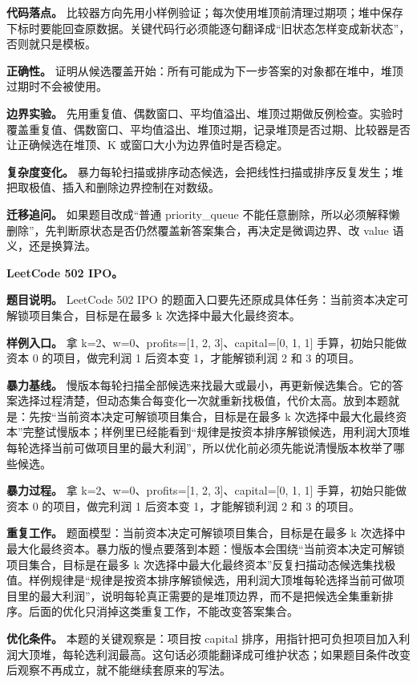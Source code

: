 \textbf{代码落点。} 比较器方向先用小样例验证；每次使用堆顶前清理过期项；堆中保存下标时要能回查原数据。关键代码行必须能逐句翻译成“旧状态怎样变成新状态”，否则就只是模板。

\textbf{正确性。} 证明从候选覆盖开始：所有可能成为下一步答案的对象都在堆中，堆顶过期时不会被使用。

\textbf{边界实验。} 先用重复值、偶数窗口、平均值溢出、堆顶过期做反例检查。实验时覆盖重复值、偶数窗口、平均值溢出、堆顶过期，记录堆顶是否过期、比较器是否让正确候选在堆顶、K 或窗口大小为边界值时是否稳定。

\textbf{复杂度变化。} 暴力每轮扫描或排序动态候选，会把线性扫描或排序反复发生；堆把取极值、插入和删除边界控制在对数级。

\textbf{迁移追问。} 如果题目改成“普通 priority\_queue 不能任意删除，所以必须解释懒删除”，先判断原状态是否仍然覆盖新答案集合，再决定是微调边界、改 value 语义，还是换算法。

\noindent\textbf{LeetCode 502 IPO。}

\textbf{题目说明。} LeetCode 502 IPO 的题面入口要先还原成具体任务：当前资本决定可解锁项目集合，目标是在最多 k 次选择中最大化最终资本。

\textbf{样例入口。} 拿 k=2、w=0、profits=[1, 2, 3]、capital=[0, 1, 1] 手算，初始只能做资本 0 的项目，做完利润 1 后资本变 1，才能解锁利润 2 和 3 的项目。

\textbf{暴力基线。} 慢版本每轮扫描全部候选来找最大或最小，再更新候选集合。它的答案选择过程清楚，但动态集合每变化一次就重新找极值，代价太高。放到本题就是：先按“当前资本决定可解锁项目集合，目标是在最多 k 次选择中最大化最终资本”完整试慢版本；样例里已经能看到“规律是按资本排序解锁候选，用利润大顶堆每轮选择当前可做项目里的最大利润”，所以优化前必须先能说清慢版本枚举了哪些候选。

\textbf{暴力过程。} 拿 k=2、w=0、profits=[1, 2, 3]、capital=[0, 1, 1] 手算，初始只能做资本 0 的项目，做完利润 1 后资本变 1，才能解锁利润 2 和 3 的项目。

\textbf{重复工作。} 题面模型：当前资本决定可解锁项目集合，目标是在最多 k 次选择中最大化最终资本。暴力版的慢点要落到本题：慢版本会围绕“当前资本决定可解锁项目集合，目标是在最多 k 次选择中最大化最终资本”反复扫描动态候选集找极值。样例规律是“规律是按资本排序解锁候选，用利润大顶堆每轮选择当前可做项目里的最大利润”，说明每轮真正需要的是堆顶边界，而不是把候选全集重新排序。后面的优化只消掉这类重复工作，不能改变答案集合。

\textbf{优化条件。} 本题的关键观察是：项目按 capital 排序，用指针把可负担项目加入利润大顶堆，每轮选利润最高。这句话必须能翻译成可维护状态；如果题目条件改变后观察不再成立，就不能继续套原来的写法。

